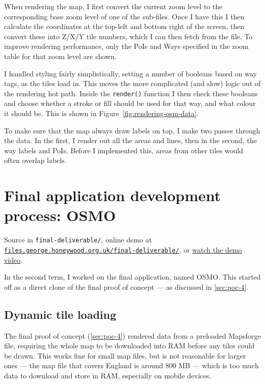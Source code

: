 \documentclass[hyphens]{final_report}
\begin{document}
When rendering the map, I first convert the current zoom level to the corresponding base zoom level of one of the sub-files. Once I have this I then calculate the coordinates at the top-left and bottom right of the screen, then convert these into Z/X/Y tile numbers, which I can then fetch from the file. To improve rendering performance, only the PoIs and Ways specified in the zoom table for that zoom level are shown.

I handled styling fairly simplistically, setting a number of booleans based on way tags, as the tiles load in. This moves the more complicated (and slow) logic out of the rendering hot path. Inside the \texttt{render()} function I then check these booleans and choose whether a stroke or fill should be used for that way, and what colour it should be. This is shown in Figure~\ref{fig:rendering-osm-data}.

To make sure that the map always draw labels on top, I make two passes through the data. In the first, I render out all the areas and lines, then in the second, the way labels and PoIs. Before I implemented this, areas from other tiles would often overlap labels.

\clearpage
\chapter{Final application development process: OSMO}

{ \footnotesize Source in \texttt{final-deliverable/}, online demo at \href{https://files.george.honeywood.org.uk/final-deliverable/#16/51.4313/-0.5472}{\nolinkurl{files.george.honeywood.org.uk/final-deliverable/}}, or \href{https://youtu.be/2XLOaLw82c8}{watch the demo video}. }

In the second term, I worked on the final application, named OSMO. This started off as a direct clone of the final proof of concept --- as discussed in \autoref{sec:poc-4}.

\section{Dynamic tile loading}

The final proof of concept (\autoref{sec:poc-4}) rendered data from a preloaded Mapsforge file, requiring the whole map to be downloaded into RAM before any tiles could be drawn. This works fine for small map files, but is not reasonable for larger ones --- the map file that covers England is around 800 MB --- which is too much data to download and store in RAM, especially on mobile devices.
\end{document}
